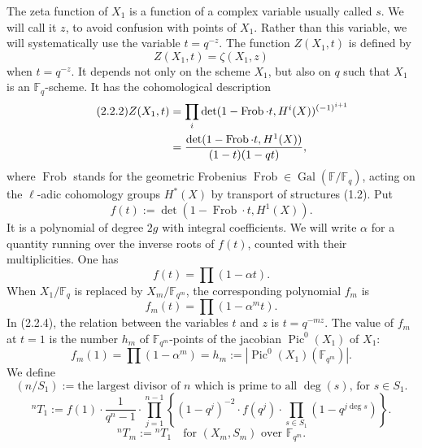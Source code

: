 \documentclass[10pt]{article}
\newcommand{\Fq}{\mathbb F_q}
\newcommand{\Fqm}{\mathbb F_{q^m}}
\newcommand{\Fb}{\mathbb F}
\newcommand{\Gal}{\operatorname{Gal}}
\newcommand{\Pic}{\operatorname{Pic}}
\newcommand{\Frob}{\operatorname{Frob}}
\newcommand{\degm}{\operatorname{deg}}
\theoremstyle{deligne}
\newcommand{\heading}[1]{\vspace{0.7em}\noindent{\bfseries #1}\quad}
\begin{document}
\heading{2.2.} The zeta function of $X_1$ is a function of a complex variable usually called $s$. We will call it $z$, to avoid confusion with points of $X_1$. Rather than this variable, we will systematically use the variable $t=q^{-z}$. The function $Z(X_1,t)$ is defined by
\begin{equation}\tag{2.2.1}
Z(X_1,t)=\zeta(X_1,z)
\end{equation}
when $t=q^{-z}$. It depends not only on the scheme $X_1$, but also on $q$ such that $X_1$ is an $\Fq$-scheme. It has the cohomological description
\begin{align}\tag{2.2.2}
Z(X_1,t)&=\prod_i\det(1-\Frob\cdot t,H^i(X))^{(-1)^{i+1}}\\
&=\frac{\det(1-\Frob\cdot t,H^1(X))}{(1-t)(1-qt)},\notag
\end{align}
where $\Frob$ stands for the geometric Frobenius $\Frob\in\Gal(\Fb/\Fq)$, acting on the $\ell$-adic cohomology groups $H^*(X)$ by transport of structures (1.2). Put
\[
f(t):=\det(1-\Frob\cdot t,H^1(X)).
\]
It is a polynomial of degree $2g$ with integral coefficients. We will write $\alpha$ for a quantity running over the inverse roots of $f(t)$, counted with their multiplicities. One has
\begin{equation}\tag{2.2.3}
f(t)=\prod(1-\alpha t).
\end{equation}
When $X_1/\Fq$ is replaced by $X_m/\Fqm$, the corresponding polynomial $f_m$ is
\begin{equation}\tag{2.2.4}
f_m(t)=\prod(1-\alpha^m t).
\end{equation}
In (2.2.4), the relation between the variables $t$ and $z$ is $t=q^{-mz}$. The value of $f_m$ at $t=1$ is the number $h_m$ of $\Fqm$-points of the jacobian $\Pic^0(X_1)$ of $X_1$:
\begin{equation}\tag{2.2.5}
f_m(1)=\prod(1-\alpha^m)=h_m:=|\Pic^0(X_1)(\Fqm)|.
\end{equation}
We define
\begin{equation}\tag{2.2.6}
(n/S_1):=\text{the largest divisor of $n$ which is prime to all $\degm(s)$, for $s\in S_1$}.
\end{equation}
\begin{equation}\tag{2.2.7}
{}^nT_1:=f(1)\cdot\frac{1}{q^n-1}\cdot
\prod_{j=1}^{n-1}\left\{(1-q^j)^{-2}\cdot f(q^j)\cdot\prod_{s\in S_1}(1-q^{j\degm s})\right\}.
\end{equation}
\begin{equation}\tag{2.2.8}
{}^nT_m:={}^nT_1\quad\text{for }(X_m,S_m)\text{ over }\Fqm.
\end{equation}
\end{document}
